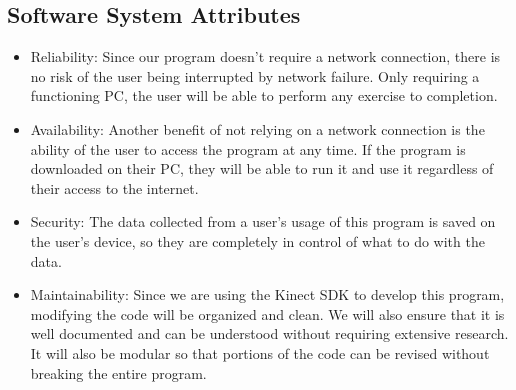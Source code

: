 \documentclass[onecolumn, draftclsnofoot,10pt, compsoc]{IEEEtran}
\begin{document}
\subsection{Software System Attributes}
\begin{itemize}
\item Reliability:
Since our program doesn't require a network connection, there is no risk of the user being interrupted by network failure. Only requiring a functioning PC, the user will be able to perform any exercise to completion.
\item Availability:
Another benefit of not relying on a network connection is the ability of the user to access the program at any time. If the program is downloaded on their PC, they will be able to run it and use it regardless of their access to the internet.
\item Security:
The data collected from a user's usage of this program is saved on the user's device, so they are completely in control of what to do with the data. 
\item Maintainability:
Since we are using the Kinect SDK to develop this program, modifying the code will be organized and clean. We will also ensure that it is well documented and can be understood without requiring extensive research. It will also be modular so that portions of the code can be revised without breaking the entire program.
\end{itemize}
\end{document}
